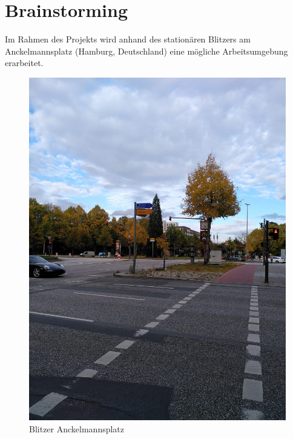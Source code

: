 \section{Brainstorming}

Im Rahmen des Projekts wird anhand des stationären Blitzers am Anckelmannsplatz (Hamburg, Deutschland) eine mögliche Arbeitsumgebung erarbeitet.

\begin{figure}[h]
\centering
\includegraphics[scale=0.2]{Sections/Brainstorming/Blitzer.jpeg}
\caption{Blitzer Anckelmannsplatz}
\label{fig:Blitzer_Anckelmannsplatz}
\end{figure}

